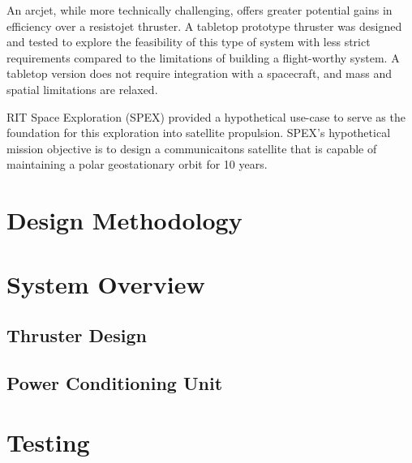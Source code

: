 \documentclass[journal]{IEEEtran}
\begin{document}
An arcjet, while more technically challenging, offers greater potential gains in efficiency over a resistojet thruster.
A tabletop prototype thruster was designed and tested to explore the feasibility of this type of system with less strict requirements compared to the limitations of building a flight-worthy system.
A tabletop version does not require integration with a spacecraft, and mass and spatial limitations are relaxed.

RIT Space Exploration (SPEX) provided a hypothetical use-case to serve as the foundation for this exploration into satellite propulsion.
SPEX's hypothetical mission objective is to design a communicaitons satellite that is capable of maintaining a polar geostationary orbit for 10 years.

\section{Design Methodology}
\label{sec:method}

\section{System Overview}

\subsection{Thruster Design}

\subsection{Power Conditioning Unit}

\section{Testing}
\end{document}
